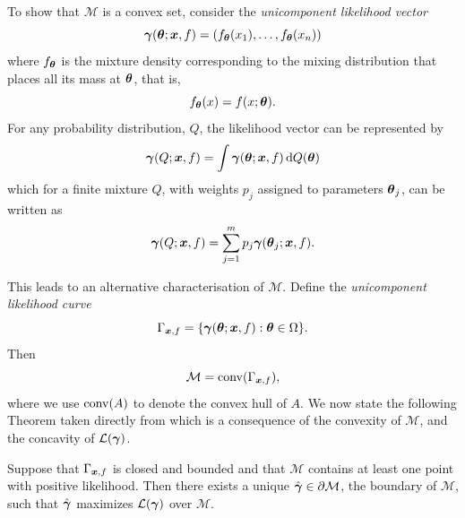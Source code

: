 	To show that $\mathcal{M}$ is a convex set, consider the \emph{unicomponent likelihood vector}
	\begin{equation}
		{\bm{{\gamma}}}({\bm{{\theta}}}; {\bm{{x}}}, f) = (f_{\bm{{\theta}}}(x_1), \dots, f_{\bm{{\theta}}}(x_n))
	\end{equation}
	where $f_{\bm{{\theta}}}$ is the mixture density corresponding to the mixing distribution that places all its mass at ${\bm{{\theta}}}$, that is, 
	\begin{equation}
		f_{\bm{{\theta}}}(x) = f(x; {\bm{{\theta}}}).
	\end{equation}
	For any probability distribution, $Q$, the likelihood vector can be represented by
	\begin{equation}
		{\bm{{\gamma}}}(Q; {\bm{{x}}}, f) = \int {\bm{{\gamma}}}({\bm{{\theta}}}; {\bm{{x}}}, f) \, \mathrm{d} Q({\bm{{\theta}}})
	\end{equation}
	which for a finite mixture $Q$, with weights $p_j$ assigned to parameters ${\bm{{\theta}}}_j$, can be written as
	\begin{equation}
		{\bm{{\gamma}}}(Q;{\bm{{x}}},f) = \sum_{j = 1}^m p_j {\bm{{\gamma}}}({\bm{{\theta}}}_j; {\bm{{x}}}, f).
	\end{equation}
	
	This leads to an alternative characterisation of $\mathcal{M}$. Define the \emph{unicomponent likelihood curve}
	\begin{equation}
		\Gamma_{{\bm{{x}}}, f} = \{{\bm{{\gamma}}}({\bm{{\theta}}}; {\bm{{x}}}, f) : {\bm{{\theta}}} \in \Omega\}.
	\end{equation}
	Then
	\begin{equation}
		\mathcal{M} = \mathrm{conv}(\Gamma_{{\bm{{x}}}, f}),
	\end{equation}
	where we use $\mathrm{conv}(A)$ to denote the convex hull of $A$. We now state the following Theorem taken directly from \cite[Theorem 18]{Lindsay1995-sq} which is a consequence of the convexity of $\mathcal{M}$, and the concavity of $\mathcal{L}({\bm{{\gamma}}})$.

	\begin{theorem}
		Suppose that $\Gamma_{{\bm{{x}}}, f}$ is closed and bounded and that $\mathcal{M}$ contains at least one point with positive likelihood. Then there exists a unique $\hat{{\bm{{\gamma}}}} \in \partial \mathcal{M}$, the boundary of $\mathcal{M}$, such that $\hat{{\bm{{\gamma}}}}$ maximizes $\mathcal{L}({\bm{{\gamma}}})$ over $\mathcal{M}$.
		\label{thm: lindsay maximizing likelihood vector point}
	\end{theorem}

